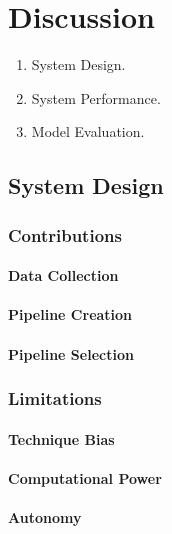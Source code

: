\documentclass[../thesis/thesis.tex]{subfiles}
\begin{document}
\chapter{Discussion}
\label{chap:discussion}


\begin{enumerate}
\item System Design. %
\item System Performance. %
\item Model Evaluation. %
\end{enumerate}

\section{System Design} %

\subsection{Contributions} %

\subsubsection{Data Collection} %
\subsubsection{Pipeline Creation} %
\subsubsection{Pipeline Selection} %

\subsection{Limitations} %

\subsubsection{Technique Bias} %
\subsubsection{Computational Power} %
\subsubsection{Autonomy} %
\end{document}
